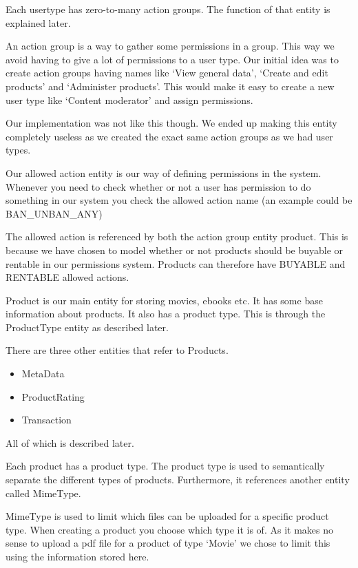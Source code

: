 Each usertype has zero-to-many action groups. The function of that entity is explained later.

An action group is a way to gather some permissions in a group. This way we avoid having to give a lot of permissions to a user type. Our initial idea was to create action groups having names like `View general data', `Create and edit products' and `Administer products'. This would make it easy to create a new user type like `Content moderator' and assign permissions.

Our implementation was not like this though. We ended up making this entity completely useless as we created the exact same action groups as we had user types.

Our allowed action entity is our way of defining permissions in the system. Whenever you need to check whether or not a user has permission to do something in our system you check the allowed action name (an example could be BAN\_UNBAN\_ANY)

The allowed action is referenced by both the action group entity product. This is because we have chosen to model whether or not products should be buyable or rentable in our permissions system. Products can therefore have BUYABLE and RENTABLE allowed actions.

Product is our main entity for storing movies, ebooks etc. It has some base information about products. It also has a product type. This is through the ProductType entity as described later.

There are three other entities that refer to Products.
\begin{itemize}
	\item MetaData
	\item ProductRating
	\item Transaction
\end{itemize}
All of which is described later.

Each product has a product type. The product type is used to semantically separate the different types of products. Furthermore, it references another entity called MimeType.

MimeType is used to limit which files can be uploaded for a specific product type. When creating a product you choose which type it is of. As it makes no sense to upload a pdf file for a product of type `Movie' we chose to limit this using the information stored here.

